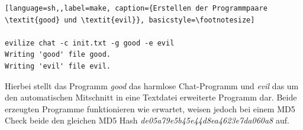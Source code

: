 \documentclass[12pt]{article}
\begin{document}
\begin{lstlisting}[language=sh,,label=make, caption={Erstellen der Programmpaare \textit{good} und \textit{evil}}, basicstyle=\footnotesize]

evilize chat -c init.txt -g good -e evil
Writing 'good' file good.
Writing 'evil' file evil.

\end{lstlisting}

Hierbei stellt das  Programm \textit{good} das harmlose Chat-Programm und \textit{evil} das um den automatischen Mitschnitt in eine Textdatei erweiterte Programm dar. Beide erzeugten Programme funktionieren wie erwartet, weisen jedoch bei einem MD5 Check beide den gleichen MD5 Hash  \textit{de05a79e5b45e44d8ea4623e7da060a8} auf.
\end{document}
